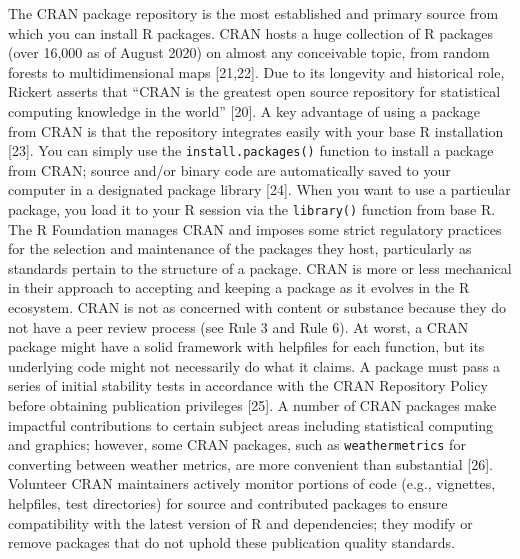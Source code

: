 \documentclass[10pt,letterpaper]{article}
\begin{document}
The CRAN package repository is the most established and primary source
from which you can install R packages. CRAN hosts a huge collection of R
packages (over 16,000 as of August 2020) on almost any conceivable
topic, from random forests to multidimensional maps {[}21,22{]}. Due to
its longevity and historical role, Rickert asserts that ``CRAN is the
greatest open source repository for statistical computing knowledge in
the world'' {[}20{]}. A key advantage of using a package from CRAN is
that the repository integrates easily with your base R installation
{[}23{]}. You can simply use the \texttt{install.packages()} function to
install a package from CRAN; source and/or binary code are automatically
saved to your computer in a designated package library {[}24{]}. When
you want to use a particular package, you load it to your R session via
the \texttt{library()} function from base R. The R Foundation manages
CRAN and imposes some strict regulatory practices for the selection and
maintenance of the packages they host, particularly as standards pertain
to the structure of a package. CRAN is more or less mechanical in their
approach to accepting and keeping a package as it evolves in the R
ecosystem. CRAN is not as concerned with content or substance because
they do not have a peer review process (see Rule 3 and Rule 6). At
worst, a CRAN package might have a solid framework with helpfiles for
each function, but its underlying code might not necessarily do what it
claims. A package must pass a series of initial stability tests in
accordance with the CRAN Repository Policy before obtaining publication
privileges {[}25{]}. A number of CRAN packages make impactful
contributions to certain subject areas including statistical computing
and graphics; however, some CRAN packages, such as
\texttt{weathermetrics} for converting between weather metrics, are more
convenient than substantial {[}26{]}. Volunteer CRAN maintainers
actively monitor portions of code (e.g., vignettes, helpfiles, test
directories) for source and contributed packages to ensure compatibility
with the latest version of R and dependencies; they modify or remove
packages that do not uphold these publication quality standards.
\end{document}
